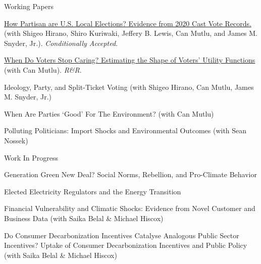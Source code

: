 \documentclass{resume}
\begin{document}
\begin{rSection}{\Large W\MakeLowercase{orking} P\MakeLowercase{apers}} \itemsep -3pt {}
\vspace{-0.7cm}

 
\item \href{https://osf.io/preprints/osf/db3mj}{How Partisan are U.S. Local Elections? Evidence from 2020 Cast Vote Records.} (with Shigeo Hirano, Shiro Kuriwaki, Jeffery B. Lewis, Can Mutlu, and James M. Snyder, Jr.). \textit{Conditionally Accepted}.

\medskip

\item \href{https://arxiv.org/abs/2501.03196}{When Do Voters Stop Caring? Estimating the Shape of Voters' Utility Functions} (with Can Mutlu). \textit{R\&R}.

\medskip

\item Ideology, Party, and Split-Ticket Voting (with Shigeo Hirano, Can Mutlu, James M. Snyder, Jr.)

\medskip 

\item When Are Parties `Good' For The Environment?  (with Can Mutlu)


\medskip

\item Polluting Politicians: Import Shocks and Environmental Outcomes (with Sean Nossek)

\end{rSection}

\bigskip


\begin{rSection}{\Large W\MakeLowercase{ork} I\MakeLowercase{n} P\MakeLowercase{rogress}} \itemsep -2pt {}
\vspace{-0.7cm}


\item Generation Green New Deal? Social Norms, Rebellion, and Pro-Climate Behavior

\medskip

\item Elected Electricity Regulators and the
Energy Transition

\medskip


\item Financial Vulnerability and Climatic Shocks: Evidence from Novel Customer and Business Data (with Saika Belal \& Michael Hiscox)

\medskip
\item Do Consumer Decarbonization Incentives Catalyse Analogous Public Sector Incentives? Uptake of Consumer Decarbonization Incentives and Public Policy (with Saika Belal \& Michael Hiscox)

\end{rSection}
\end{document}
